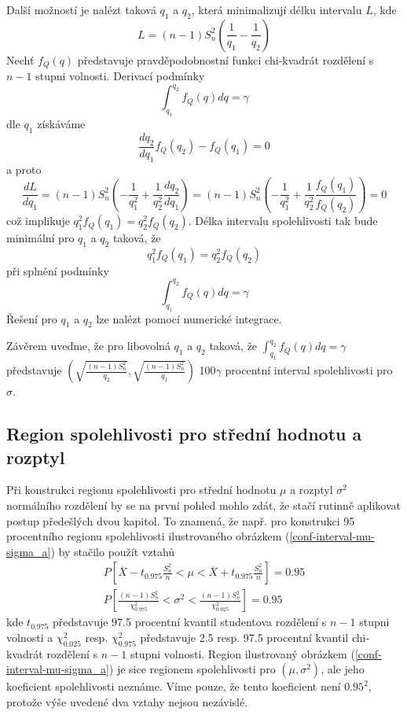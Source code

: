 Další možností je nalézt taková $q_1$ a $q_2$, která minimalizují délku intervalu $L$, kde
\begin{equation*}
L = (n - 1)S_n^2 \left(\frac{1}{q_1} - \frac{1}{q_2}\right)
\end{equation*}
Nechť $f_Q(q)$ představuje pravděpodobnostní funkci chi-kvadrát rozdělení s $n - 1$ stupni volnosti. Derivací podmínky
\begin{equation*}
\int_{q_1}^{q_2} f_Q(q)dq = \gamma
\end{equation*}
dle $q_1$ získáváme
\begin{equation*}
\frac{dq_2}{dq_1}f_Q(q_2) - f_Q(q_1) = 0
\end{equation*}
a proto
\begin{equation*}
\frac{dL}{dq_1} = (n - 1)S_n^2\left(-\frac{1}{q_1^2} + \frac{1}{q_2^2}\frac{dq_2}{dq_1}\right) = (n - 1)S_n^2\left(- \frac{1}{q_1^2} + \frac{1}{q_2^2}\frac{f_Q(q_1)}{f_Q(q_2)}\right) = 0
\end{equation*}
což implikuje $q_1^2 f_Q(q_1) = q_2^2 f_Q(q_2)$. Délka intervalu spolehlivosti tak bude minimální pro $q_1$ a $q_2$ taková, že
\begin{equation*}
q_1^2 f_Q(q_1) = q_2^2 f_Q(q_2)
\end{equation*}
při splnění podmínky
\begin{equation*}
\int_{q_1}^{q_2} f_Q(q) dq = \gamma
\end{equation*}
Řešení pro $q_1$ a $q_2$ lze nalézt pomocí numerické integrace.

Závěrem uveďme, že pro libovolná $q_1$ a $q_2$ taková, že $\int_{q_1}^{q_2}f_Q(q)dq = \gamma$ představuje $\left(\sqrt{\frac{(n - 1)S_n^2}{q_2}}, \sqrt{\frac{(n - 1)S_n^2}{q_1}}
\right)$ 100$\gamma$ procentní interval spolehlivosti pro $\sigma$.

\subsection{Region spolehlivosti pro střední hodnotu a rozptyl}

Při konstrukci regionu spolehlivosti pro střední hodnotu $\mu$ a rozptyl $\sigma^2$ normálního rozdělení by se na první pohled mohlo zdát, že stačí rutinně aplikovat postup předešlých dvou kapitol. To znamená, že např. pro konstrukci 95 procentního regionu spolehlivosti ilustrovaného obrázkem (\ref{conf-interval-mu-sigma_a}) by stačilo použít vztahů
\begin{gather*}
P\left[\overline{X} - t_{0.975}\frac{S_n^2}{n} < \mu < \overline{X} + t_{0.975}\frac{S_n^2}{n}\right] = 0.95\\
P\left[\frac{(n - 1)S_n^2}{\chi_{0.975}^2} < \sigma^2 < \frac{(n - 1)S_n^2}{\chi_{0.025}^2}\right] = 0.95
\end{gather*}
kde $t_{0.975}$ představuje 97.5 procentní kvantil studentova rozdělení s $n - 1$ stupni volnosti a $\chi_{0.025}^2$ resp. $\chi_{0.975}^2$ představuje 2.5 resp. 97.5
 procentní kvantil chi-kvadrát rozdělení s $n - 1$ stupni volnosti. Region ilustrovaný obrázkem (\ref{conf-interval-mu-sigma_a}) je sice regionem spolehlivosti pro $(\mu, \sigma^2)$, ale jeho koeficient spolehlivosti neznáme. Víme pouze, že tento koeficient není $0.95^2$, protože výše uvedené dva vztahy nejsou nezávislé.

